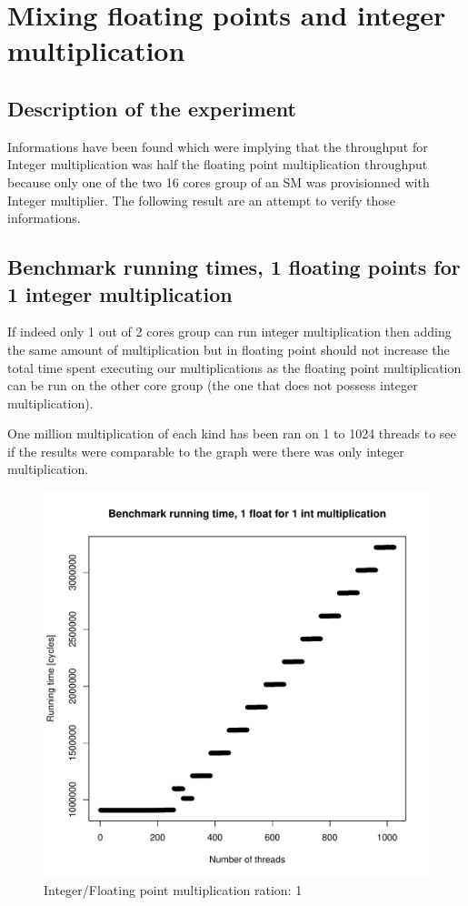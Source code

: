 \documentclass{article}
\begin{document}
\section{Mixing floating points and integer multiplication}
	\subsection{Description of the experiment}
	Informations have been found which were implying that the throughput for Integer multiplication was half the floating point multiplication throughput because only one of the two 16 cores group of an SM was provisionned with Integer multiplier.
	The following result are an attempt to verify those informations.
	\subsection{Benchmark running times, 1 floating points for 1 integer multiplication}
	If indeed only 1 out of 2 cores group can run integer multiplication then adding the same amount of multiplication but in floating point should not increase the total time spent executing our multiplications as the floating point multiplication can be run on the other core group (the one that does not possess integer multiplication).
	
	One million multiplication of each kind has been ran on 1 to 1024 threads to see if the results were comparable to the graph were there was only integer multiplication.
	\begin{figure}[h]
		\centering
		\vspace{-20pt}
    			\includegraphics[width=.5\linewidth]{"graphics/running_times_ratio11"}
		\vspace{-20pt}
		\caption{Integer/Floating point multiplication ration: 1}
	\end{figure}
	\pagebreak
\end{document}

